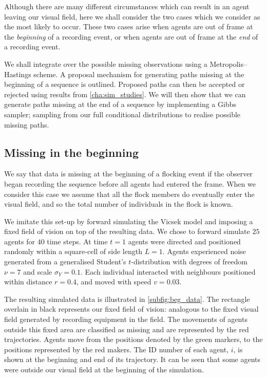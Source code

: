 Although there are many different circumstances which can result in an agent
leaving our visual field, here we shall consider the two cases which we
consider as the most likely to occur. These two cases arise when agents are
out of frame at the \emph{beginning} of a recording event, or when
agents are out of frame at the \emph{end} of a recording event.

We shall integrate over the possible missing observations using a
Metropolis--Hastings scheme. A proposal mechanism for generating paths missing
at the beginning of a sequence is outlined. Proposed paths can then be accepted
or rejected using results from \cref{cha:sim_studies}. We will then show that
we can generate paths missing at the end of a sequence by implementing a Gibbs
sampler; sampling from our full conditional distributions to realise possible
missing paths.

\subsection{Missing in the beginning}

We say that data is missing at the beginning of a flocking event if the
observer began recording the sequence before all agents had entered the frame.
When we consider this case we assume that all the flock members do eventually
enter the visual field, and so the total number of individuals in the flock is
known.

We imitate this set-up by forward simulating the Vicsek model and imposing a
fixed field of vision on top of the resulting data. We chose to forward
simulate $25$ agents for $40$ time steps. At time $t=1$ agents were directed
and positioned randomly within a square-cell of side length $L=1$. Agents
experienced noise generated from a generalised Student's $t$-distribution with
degrees of freedom $\nu=7$ and scale $\sigma_Y=0.1$. Each individual interacted
with neighbours positioned within distance $r=0.4$, and moved with speed
$v=0.03$.

The resulting simulated data is illustrated in \cref{subfig:beg_data}. The
rectangle overlain in black represents our fixed field of vision: analogous to
the fixed visual field generated by recording equipment in the field. The
movements of agents outside this fixed area are classified as missing and are
represented by the red trajectories. Agents move from the positions denoted by
the green markers, to the positions represented by the red makers. The ID
number of each agent, $i$, is shown at the beginning and end of its trajectory.
It can be seen that some agents were outside our visual field at the beginning
of the simulation. 

